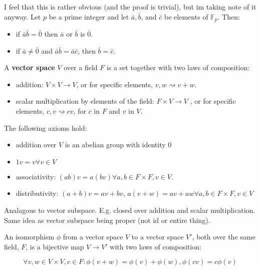 \begin{definition}

  I feel that this is rather obvious (and the proof is trivial), but im taking
  note of it anyway. Let $p$ be a prime integer and let $\bar{a},\bar{b}$, and
  $\bar{c}$ be elements of $\mathbb{F}_{p}$. Then:
  \begin{itemize}
      \item if $\bar{a}\bar{b}=\bar{0}$ then $\bar{a}$ or $\bar{b}$ is $\bar{0}$.
      \item if $\bar{a}\neq \bar{0}$ and $\bar{a}\bar{b}=\bar{a}\bar{c}$, then
      $\bar{b} = \bar{c}$.
  \end{itemize}

\end{definition}

\begin{definition}
  A \textbf{vector space} $V$ over a field $F$ is a set together with two laws
  of composition:
  \begin{itemize}
    \item addition: $V \times V \rightarrow V$, or for specific elements,
      $v, w \rightsquigarrow v + w$.
    \item scalar multiplication by elements of the field: $F \times V \rightarrow V$
      , or for specific elements, $c, v \rightsquigarrow cv$, for $c$ in $F$ and
      $v$ in $V$.
  \end{itemize}

  The following axioms hold:
  \begin{itemize}
    \item addition over $V$ is an abelian group with identity $0$
    \item $1v = v \forall v \in V$
    \item associativity: $(ab)v = a(bv)\forall a, b \in F \times F, v \in V$.
    \item distributivity:
      $(a+b)v = av + bv$, $a(v+w)=av + aw \forall a, b \in F \times F, v \in V$

  \end{itemize}

\end{definition}

\begin{definition}
  Analagous to vector subspace. E.g. closed over addition and scalar
  multiplication. Same idea as vector subspace being proper (not id or entire thing).
\end{definition}

\begin{definition}
  An isomorphism $\phi$ from a vector space $V$ to a vector space $V'$, both over
  the same field, $F$, is a bijective map $V \rightarrow V'$ with two laws of composition:

  \[\forall v,w \in V \times V, c \in F: \phi ( v + w ) = \phi (v) + \phi (w), \phi (cv) = c \phi (v)\]

\end{definition}

